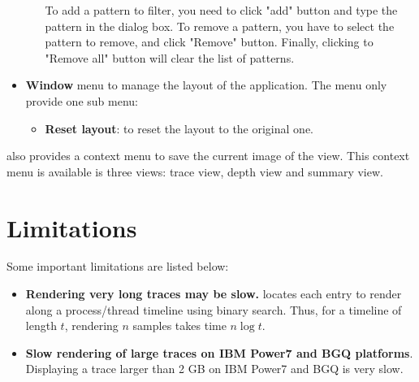 \begin{itemize}
\begin{itemize}
To add a pattern to filter, you need to click "add" button and type the pattern in the dialog box. To remove a pattern, you have to select the pattern to remove, and click "Remove" button. Finally, clicking to "Remove all" button will clear the list of patterns.
 \end{itemize}
 \item \textbf{Window} menu to manage the layout of the application. The menu only provide one sub menu:
 \begin{itemize}
  \item \textbf{Reset layout}: to reset the layout to the original one.
 \end{itemize}
\end{itemize}

\hpctraceviewer{} also provides a context menu to save the current image of the view. 
This context menu is available is three views: trace view, depth view and summary view.




\section{Limitations}

Some important \hpctraceviewer{} limitations are listed below:
\begin{itemize}

\item \textbf{Rendering very long traces may be slow.} \hpctraceviewer{} locates each entry to render along a process/thread timeline using binary search. Thus, for a timeline of length $t$, rendering $n$ samples takes time $n \log t$. 

\item \textbf{Slow rendering of large traces on IBM Power7 and BGQ platforms}.
	Displaying a  trace larger than 2 GB on IBM Power7 and BGQ is very slow. 


\end{itemize}
